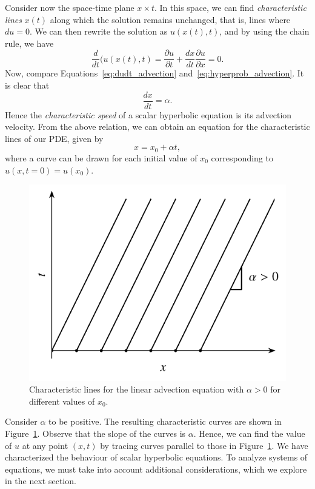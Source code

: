 Consider now the space-time plane $x\times t$. In this space, we can find \textit{characteristic lines} $x(t)$ along which the solution remains unchanged, that is, lines where $du=0$. We can then rewrite the solution as $u(x(t),t)$, and by using the chain rule, we have 
\begin{equation}
	\frac{d}{dt} (u(x(t),t) = \frac{\partial u}{\partial t} + \frac{d x}{dt} \frac{\partial u}{\partial x} = 0.
	\label{eq:dudt_advection}
\end{equation}
Now, compare Equations~\ref{eq:dudt_advection} and~\ref{eq:hyperprob_advection}. It is clear that
\begin{equation}
	\frac{dx}{dt} = \alpha.
	\label{eq:dxdt_advection}
\end{equation}
Hence the \textit{characteristic speed} of a scalar hyperbolic equation is its advection velocity. From the above relation, we can obtain an equation for the characteristic lines of our PDE, given by
\begin{equation}
	x = x_0 + \alpha t,
\end{equation}
where a curve can be drawn for each initial value of $x_0$ corresponding to $u(x,t=0)=u(x_0)$. 
\begin{figure}[htbp]
	\centering
	\includegraphics[width=0.5\linewidth]{Pictures/lsc_characteristics}
	\caption{Characteristic lines for the linear advection equation with $\alpha>0$ for different values of $x_0$.}
	\label{fig:linscal_charact}
\end{figure}

Consider $\alpha$ to be positive. The resulting characteristic curves are shown in Figure~\ref{fig:linscal_charact}. Observe that the slope of the curves is $\alpha$. Hence, we can find the value of $u$ at any point $(x,t)$ by tracing curves parallel to those in Figure~\ref{fig:linscal_charact}. We have characterized the behaviour of scalar hyperbolic equations. To analyze systems of equations, we must take into account additional considerations, which we explore in the next section.

